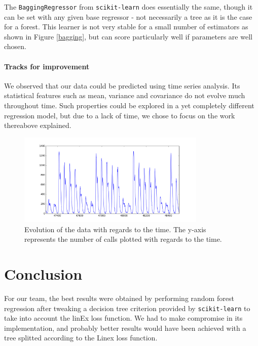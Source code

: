\documentclass[a4paper,10pt]{article}
\begin{document}
  The {\tt BaggingRegressor} from {\tt scikit-learn} does essentially the same, though it can be set with any given base regressor - not necessarily a tree as it is the case for a forest. This learner is not very stable for a small number of estimators as shown in Figure \ref{bagging}, but can score particularly well if parameters are well chosen.

  \subsection{Tracks for improvement}

  We observed that our data could be predicted using time series analysis. Its statistical features such as mean, variance and covariance do not evolve much throughout time. Such properties could be explored in a yet completely different regression model, but due to a lack of time, we chose to focus on the work thereabove explained.

  \begin{figure}
    \centering
    \includegraphics[width=0.8\textwidth]{graphics/3-Time_series.png}
    \caption{Evolution of the data with regards to the time. The y-axis represents the number of calls plotted with regards to the time.}
    \label{time_series}
  \end{figure}

\part{Conclusion}

  For our team, the best results were obtained by performing random forest regression after tweaking a decision tree criterion provided by {\tt scikit-learn} to take into account the linEx loss function. We had to make compromise in its implementation, and probably better results would have been achieved with a tree splitted according to the Linex loss function.
\end{document}
